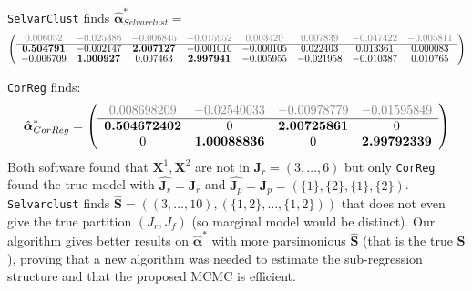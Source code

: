 \documentclass[12pt,a4paper]{report}
\begin{document}
{\tt SelvarClust} finds $\hat{\boldsymbol{\alpha}}^*_{Selvarclust}=$
\begin{displaymath}
{\fontsize{10}{10}\selectfont
	\left (\begin{array}{cccccccc}
	\textcolor{gray}{0.006052} &\textcolor{gray}{-0.025386} &\textcolor{gray}{-0.006845}&\textcolor{gray}{ -0.015952} &\textcolor{gray}{0.003420}& \textcolor{gray}{0.007839} &\textcolor{gray}{-0.047422}& \textcolor{gray}{-0.005811} \\
	\hline
\textbf{0.504791} &-0.002147& \textbf{2.007127} &-0.001010 &-0.000105 &0.022403 &0.013361 &0.000083 \\
-0.006709 &\textbf{1.000927} &0.007463&\textbf{2.997941}& -0.005955 &-0.021958 &-0.010387 &0.010765
	\end{array} \right )}
\end{displaymath}		
	
	{\tt CorReg} finds:
\begin{displaymath}
	\hat{\boldsymbol{\alpha}}^*_{CorReg}=\left(
	\begin{array}{cccc}
	\textcolor{gray}{0.008698209} &\textcolor{gray}{-0.02540033} &\textcolor{gray}{-0.00978779} &\textcolor{gray}{-0.01595849} \\
	\hline
 \textbf{0.504672402}  &0&           \textbf{2.00725861} &0          \\
 0&            \textbf{1.00088836}  &0&           \textbf{2.99792339} 
	\end{array} 
	\right)
\end{displaymath}		
Both software found that $\boldsymbol{X}^1,\boldsymbol{X}^2$ are not in $\boldsymbol{J}_r=(3,\dots,6)$ but only {\tt CorReg} found the true model with $\hat{\boldsymbol{J}_r}=\boldsymbol{J}_r$ and $\hat{\boldsymbol{J}_p}=\boldsymbol{J}_p=(\{ 1\},\{ 2\},\{1 \},\{ 2\})$. 
{\tt Selvarclust} finds $\hat{\boldsymbol{S}}=((3,\dots,10),(\{1,2\},\dots,\{1,2\}))$ that does not even give the true partition $(J_r,J_f)$ (so marginal model would be distinct).
Our algorithm gives better results on $\hat{\boldsymbol{\alpha}}^*$ with more parsimonious $\hat{\boldsymbol{S}}$ (that is the true $\boldsymbol{S}$), proving that a new algorithm was needed to estimate the sub-regression structure and that the proposed MCMC is efficient.
\end{document}
